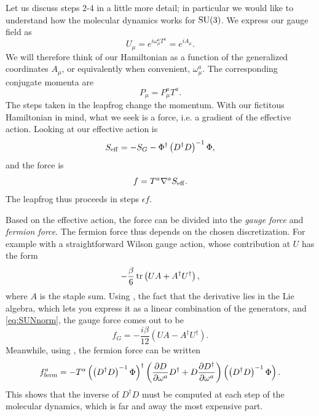 Let us discuss steps 2-4 in a little more detail; in particular we would like to
understand how the molecular dynamics works for $\operatorname{SU}(3)$. We express our gauge
field as
\begin{equation}
U_\mu=e^{i\omega_\mu^aT^a}=e^{iA_\mu}.
\end{equation}
We will therefore think of our Hamiltonian as a function of the
generalized coordinates $A_\mu$, or equivalently when convenient,
$\omega_\mu^a$. The corresponding conjugate momenta are
\begin{equation}
P_\mu=P^a_\mu T^a.
\end{equation}
The steps taken in the leapfrog change the momentum. With our fictitous 
Hamiltonian in mind, what we seek is a force, i.e. a gradient of
the effective action. Looking at  our effective
action is
\begin{equation}
S_{\rm eff}=-S_G-\Phi^\dagger\left(D^\dagger D\right)^{-1}\Phi,
\end{equation}
and the force is
\begin{equation}
f=T^a\nabla^aS_{\rm eff}.
\end{equation}
The leapfrog thus proceeds in steps $\epsilon f$.

Based on the effective action, the force can be divided into the
{\it gauge force} and {\it fermion force}. The fermion force thus 
depends on the chosen discretization. For example with a straightforward Wilson
gauge action, whose contribution at $U$ has the form
\begin{equation}
-\frac{\beta}{6}\tr\left(UA+A^\dagger U^\dagger\right),
\end{equation}
where $A$ is the staple sum. Using ,
the fact that the derivative lies in the Lie algebra,
which lets you express it as a linear combination of the generators,
and \eqref{eq:SUNnorm}, the gauge force comes out to be
\begin{equation}
f_G=-\frac{i\beta}{12}\left(UA-A^\dagger U^\dagger\right).
\end{equation}
Meanwhile, using , 
the fermion force can be written 
\begin{equation}
f_{\rm ferm}^a=
-T^a\left(\left(D^\dagger D\right)^{-1}\Phi\right)^\dagger
\left(\pdv{D}{\omega^a}D^\dagger+D\pdv{D^\dagger}{\omega^a}\right)
\left(\left(D^\dagger D\right)^{-1}\Phi\right).
\end{equation}
This shows that the inverse of $D^\dagger D$ must be computed
at each step of the molecular dynamics, which is far and away
the most expensive part.

